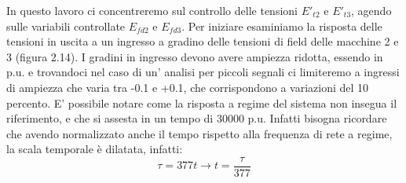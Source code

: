 \documentclass[Lau,noexaminfo]{sapthesis}
\begin{document}
\newpage	
	In questo lavoro ci concentreremo sul controllo delle tensioni $E'_{t2}$ e $E'_{t3}$, agendo sulle variabili controllate $E_{fd2}$ e $E_{fd3}$. Per iniziare esaminiamo la risposta delle tensioni in uscita a un ingresso a gradino delle tensioni di field delle macchine 2 e 3 (figura 2.14). I gradini in ingresso devono avere ampiezza ridotta, essendo in p.u. e trovandoci nel caso di un' analisi per piccoli segnali ci limiteremo a ingressi di ampiezza che varia tra -0.1 e +0.1, che corrispondono a variazioni del 10 percento. E' possibile notare come la risposta a regime del sistema non insegua il riferimento, e che si assesta in un tempo di 30000 p.u. Infatti bisogna ricordare che avendo normalizzato anche il tempo rispetto alla frequenza di rete a regime, la scala temporale è dilatata, infatti:\\
	\begin{equation}
	\tau=377t \rightarrow t=\frac{\tau}{377}
	\end{equation}
\end{document}
